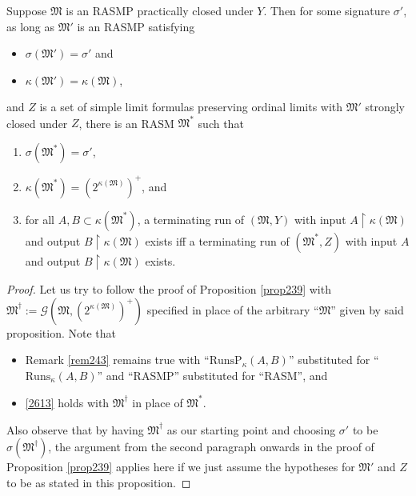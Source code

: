 \documentclass[12pt]{article}
\numberwithin{equation}{section}
\begin{document}
\begin{prop}\label{prop261}
Suppose $\mathfrak{M}$ is an RASMP practically closed under $Y$. Then for some signature $\sigma'$, as long as $\mathfrak{M}'$ is an RASMP satisfying
\begin{itemize}
    \item $\sigma(\mathfrak{M}') = \sigma'$ and
    \item $\kappa(\mathfrak{M}') = \kappa(\mathfrak{M})$,
\end{itemize}
and $Z$ is a set of simple limit formulas preserving ordinal limits with $\mathfrak{M}'$ strongly closed under $Z$, there is an RASM $\mathfrak{M}^*$ such that
\begin{enumerate}[label=(\arabic*)]
    \item $\sigma(\mathfrak{M}^*) = \sigma'$,
    \item $\kappa(\mathfrak{M}^*) = (2^{\kappa(\mathfrak{M})})^+$, and
    \item\label{2613} for all $A, B \subset \kappa(\mathfrak{M}^*)$, a terminating run of $(\mathfrak{M}, Y)$ with input $A \restriction \kappa(\mathfrak{M})$ and output $B \restriction \kappa(\mathfrak{M})$ exists iff a terminating run of $(\mathfrak{M}^*, Z)$ with input $A$ and output $B \restriction \kappa(\mathfrak{M})$ exists.
\end{enumerate}
\end{prop}

\begin{proof}
Let us try to follow the proof of Proposition \ref{prop239} with $\mathfrak{M}^{\dagger} := \mathcal{G}(\mathfrak{M}, (2^{\kappa(\mathfrak{M})})^+)$ specified in place of the arbitrary ``$\mathfrak{M}$'' given by said proposition. Note that 
\begin{itemize}
    \item Remark \ref{rem243} remains true with ``$\mathrm{RunsP}_{\kappa}(A, B)$'' substituted for ``$\mathrm{Runs}_{\kappa}(A, B)$'' and ``RASMP'' substituted for ``RASM'', and 
    \item \ref{2613} holds with $\mathfrak{M}^{\dagger}$ in place of $\mathfrak{M}^*$.
\end{itemize}
Also observe that by having $\mathfrak{M}^{\dagger}$ as our starting point and choosing $\sigma'$ to be $\sigma(\mathfrak{M}^{\dagger})$, the argument from the second paragraph onwards in the proof of Proposition \ref{prop239} applies here if we just assume the hypotheses for $\mathfrak{M}'$ and $Z$ to be as stated in this proposition. 
\end{proof}
\end{document}
